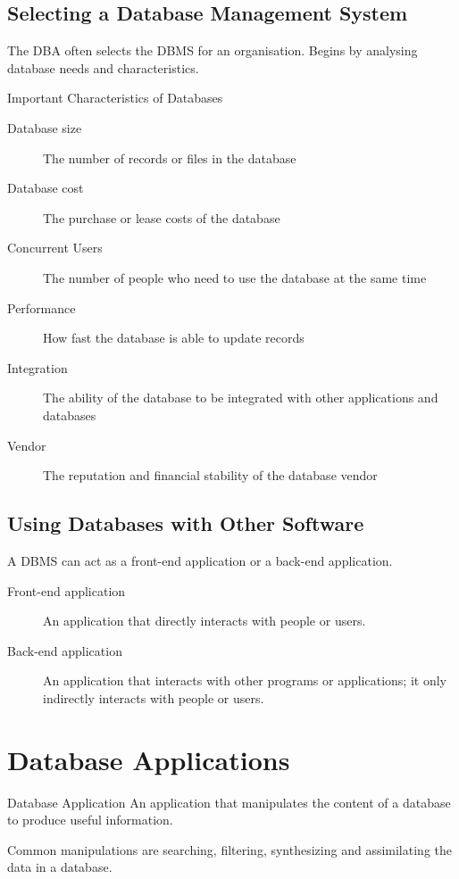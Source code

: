 \documentclass[\main/notes.tex]{subfiles}
\begin{document}
			\subsection{Selecting a Database Management System}
				The DBA often selects the DBMS for an organisation. Begins by analysing database needs and characteristics.
				\begin{sidenote}{Important Characteristics of Databases}
					\begin{description}
						\item[Database size] The number of records or files in the database
						\item[Database cost] The purchase or lease costs of the database
						\item[Concurrent Users] The number of people who need to use the database at the same time
						\item[Performance] How fast the database is able to update records
						\item[Integration] The ability of the database to be integrated with other applications and databases
						\item[Vendor] The reputation and financial stability of the database vendor 
					\end{description}
				\end{sidenote}
			\subsection{Using Databases with Other Software}
				A DBMS can act as a front-end application or a back-end application.
				\begin{indentparagraph}
					\begin{description}
						\item[Front-end application] An application that directly interacts with people or users.
						\item[Back-end application] An application that interacts with other programs or applications; it only indirectly interacts with people or users.
					\end{description}
				\end{indentparagraph}

		\pagebreak
		\section{Database Applications}
			\begin{definition}{Database Application}
				An application that manipulates the content of a database to produce useful information.

				Common manipulations are searching, filtering, synthesizing and assimilating the data in a database.
			\end{definition}
\end{document}
